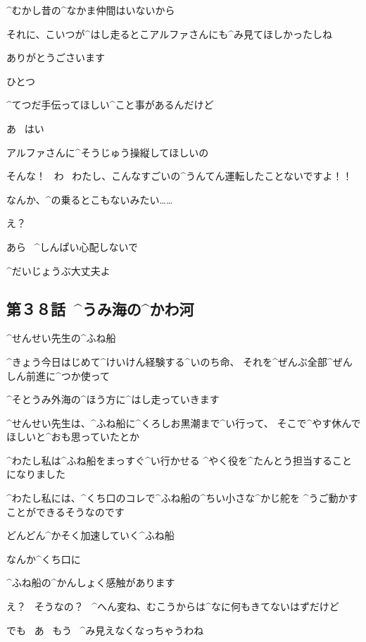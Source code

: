 \Sensei ^{むかし}{昔}の^{なかま}{仲間}はいないから

\Sensei それに、こいつが^{はし}{走}るとこアルファさんにも^{み}{見}てほしかったしね

\page
\Alpha ありがとうごさいます

\Sensei ひとつ

\Sensei ^{てつだ}{手伝}ってほしい^{こと}{事}があるんだけど

\Alpha あ
\ はい

\Sensei アルファさんに^{そうじゅう}{操縦}してほしいの

\page
\Alpha そんな！
\ わ
\ わたし、こんなすごいの^{うんてん}{運転}したことないですよ！！

\Alpha なんか、^{の}{乗}るとこもないみたい……

\Sensei え？

\Sensei あら
\ ^{しんぱい}{心配}しないで

\Sensei ^{だいじょうぶ}{大丈夫}よ


\subsection{第３８話\ ^{うみ}{海}の^{かわ}{河}}

\page[83]
\Alpha ^{せんせい}{先生}の^{ふね}{船}

\Alpha ^{きょう}{今日}はじめて^{けいけん}{経験}する^{いのち}{命}、
それを^{ぜんぶ}{全部}^{ぜんしん}{前進}に^{つか}{使}って

\Alpha ^{そとうみ}{外海}の^{ほう}{方}に^{はし}{走}っていきます

\Alpha ^{せんせい}{先生}は、^{ふね}{船}に^{くろしお}{黒潮}まで^{い}{行}って、
そこで^{やす}{休}んでほしいと^{おも}{思}っていたとか

\page
\Alpha ^{わたし}{私}は^{ふね}{船}をまっすぐ^{い}{行}かせる
^{やく}{役}を^{たんとう}{担当}することになりました

\Alpha ^{わたし}{私}には、^{くち}{口}のコレで^{ふね}{船}の^{ちい}{小}さな^{かじ}{舵}を
^{うご}{動}かすことができるそうなのです

\page
\Alpha どんどん^{かそく}{加速}していく^{ふね}{船}

\page
\Alpha なんか^{くち}{口}に

\Alpha ^{ふね}{船}の^{かんしょく}{感触}があります

\Sensei え？
\ そうなの？
\ ^{へん}{変}ね、むこうからは^{なに}{何}もきてないはずだけど

\Sensei でも
\ あ
\ もう
\ ^{み}{見}えなくなっちゃうわね

